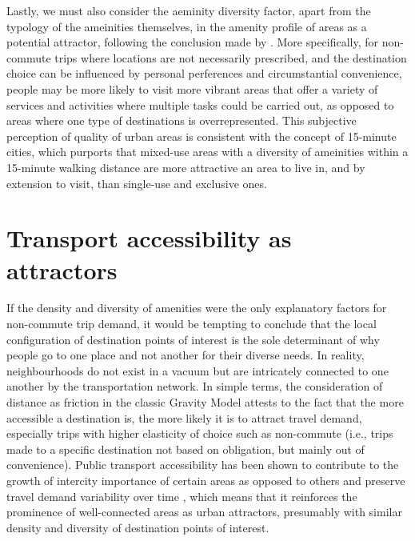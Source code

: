 Lastly, we must also consider the aeminity diversity factor, apart from the typology of the ameinities themselves, in the amenity profile of areas as a potential attractor, following the conclusion made by \citet{cerveroTravelDemand3Ds1997}. More specifically, for non-commute trips where locations are not necessarily prescribed, and the destination choice can be influenced by personal perferences and circumstantial convenience, people may be more likely to visit more vibrant areas that offer a variety of services and activities where multiple tasks could be carried out, as opposed to areas where one type of destinations is overrepresented. This subjective perception of quality of urban areas is consistent with the concept of 15-minute cities, which purports that mixed-use areas with a diversity of ameinities within a 15-minute walking distance are more attractive an area to live in, and by extension to visit, than single-use and exclusive ones. \citep{khavarian-garmsirGardenCity15Minute2023}

\section{Transport accessibility as attractors}

If the density and diversity of amenities were the only explanatory factors for non-commute trip demand, it would be tempting to conclude that the local configuration of destination points of interest is the sole determinant of why people go to one place and not another for their diverse needs. In reality, neighbourhoods do not exist in a vacuum but are intricately connected to one another by the transportation network. In simple terms, the consideration of distance as friction in the classic Gravity Model attests to the fact that the more accessible a destination is, the more likely it is to attract travel demand, especially trips with higher elasticity of choice such as non-commute (i.e., trips made to a specific destination not based on obligation, but mainly out of convenience). 
Public transport accessibility has been shown to contribute to the growth of intercity importance of certain areas as opposed to others and preserve travel demand variability over time \citep{zhongMeasuringVariabilityMobility2015}, which means that it reinforces the prominence of well-connected areas as urban attractors, presumably with similar density and diversity of destination points of interest. 

